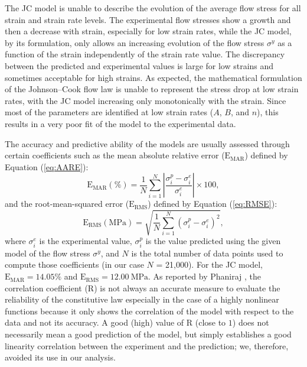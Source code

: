 \documentclass[metals,article,accept,pdftex,moreauthors]{Definitions/mdpi}
\DeclareRobustCommand{\RMSE}{\text{E}_\text{RMS}}
\DeclareRobustCommand{\MARE}{\text{E}_\text{MAR}}
\DeclareRobustCommand{\R}{\text{R}}
\DeclareRobustCommand{\MPa}{\text{MPa}}
\begin{document}
The JC model is unable to describe the evolution of the average flow stress for all strain and strain rate levels. The experimental flow stresses show a growth and then a decrease with strain, especially for low strain rates, while the JC model, by its formulation, only allows an increasing evolution of the flow stress $\sigma^y$ as a function of the strain independently of the strain rate value.
The discrepancy between the predicted and experimental values is large for low strains and sometimes acceptable for high strains.
As expected, the mathematical formulation of the Johnson--Cook flow law is unable to represent the stress drop at low strain rates, with the JC model increasing only monotonically with the strain.
Since most of the parameters are identified at low strain rates ($A$, $B$, and $n$), this results in a very poor fit of the model to the experimental data.

The accuracy and predictive ability of the models are usually assessed through certain coefficients such as the mean absolute relative error ($\MARE$) defined by Equation (\ref{eq:AARE}):
\begin{equation}
\MARE(\%) = \frac{1}{N} \sum_{i=1}^{N}{\left|\frac{\sigma_i^p -\sigma_i^e}{\sigma_i^e}\right|} \times 100, \label{eq:AARE}
\end{equation}
and the root-mean-squared error ($\RMSE$) defined by Equation (\ref{eq:RMSE}):
\begin{equation}
\RMSE (\MPa) = \sqrt{\frac{1}{N} \sum_{i=1}^{N} \left(\sigma_i^p - \sigma_i^e\right)^2}, \label{eq:RMSE}
\end{equation}
where $\sigma_i^e$ is the experimental value, $\sigma_i^p$ is the value predicted using the given model of the flow stress $\sigma^y$, and $N$ is the total number of data points used to compute those coefficients (in our case $N$ = 21,000).
For the JC model, $\MARE=14.05\%$ and $\RMSE=12.00~\MPa$.
As reported by Phaniraj \cite{Phaniraj-2003}, the correlation coefficient ($\R$) is not always an accurate measure to evaluate the reliability of the constitutive law especially in the case of a highly nonlinear functions because it only shows the correlation of the model with respect to the data and not its accuracy.
A good (high) value of $\R$ (close to $1$) does not necessarily mean a good prediction of the model, but simply establishes a good linearity correlation between the experiment and the prediction; we, therefore, avoided its use in our analysis.

\end{document}
